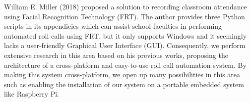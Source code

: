 William E. Miller (2018) proposed a solution to recording classroom attendance using
Facial Recognition Technology (FRT). The author provides three Python scripts in its
appendicies which can assist school faculties in performing automated roll calls using FRT,
but it only supports Windows and it seemingly lacks a user-friendly Graphical User Interface (GUI). 
Consequently, we perform extensive research in this area based on his previous works,
proposing the architecture of a cross-platform and easy-to-use roll call automation system.
By making this system cross-platform, we open up many possibilities in this area such as
enabling the installation of our system on a portable embedded system like Raspberry Pi.
